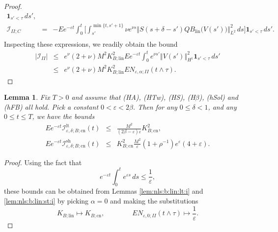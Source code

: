 \documentclass[10pt]{articleHJ}
\newcommand{\e}{\ensuremath{\varepsilon}}
\newcommand{\abs}[1]{\left\vert#1\right\vert}			%
\newcommand{\norm}[1]{\left\Vert#1\right\Vert}		%
\newtheorem{lem}[thm]{Lemma}
\numberwithin{equation}{section}
\begin{document}
\begin{proof}
\begin{equation}
\begin{array}{lcl}
         \mathbf{1}_{s' < \tau} \, ds' ,
\\[0.2cm]
\mathcal{I}_{II;C}
 & = &
   - E e^{- \e t}  \int_0^{t}
 \Big[\int_{s'}^{\min\{ t,s'+1 \} }
                      \nu e^{\nu s}
    \norm{  S(s + \delta -s') Q B_{\mathrm{lin}}\big(V(s')\big) }_{L^2}^2   \, ds
                   \Big]   \mathbf{1}_{s' < \tau}     \, ds ' .
 \\[0.2cm]
\end{array}
\end{equation}
Inspecting these expressions, we readily obtain the bound
\begin{equation}
\begin{array}{lcl}
\abs{\mathcal{I}_{II} }
& \le &
  e^{\nu} (2 + \nu)
  M^2 K_{B;\mathrm{lin}}^2
    E e^{ - \e t}
    \int_0^{t}
       e^{\nu s'}
         \norm{V(s')}_{H^1}^2 \mathbf{1}_{s' < \tau} \, ds'
\\[0.2cm]
& \le &
  e^{\nu} (2 + \nu)
  M^2 K_{B;\mathrm{lin}}^2
    E N_{\e, \alpha;II}(t \wedge \tau).
\end{array}
\end{equation}
\end{proof}



\begin{lem}
\label{lem:nls:b:cn:i}
Fix $T > 0$ and assume that (HA), (HTw), (HS),
(H$\beta$),
(hSol) and (hFB) all hold.
Pick a constant $0 < \e <  2 \beta$.
Then for
any $0 \le \delta < 1$,
and any $0 \le t \le T$,
we have the bounds
\begin{equation}
\begin{array}{lcl}
E e^{-\e t} \mathcal{I}^{\mathrm{lt}}_{\e,\delta;B;\mathrm{cn}}(t)
 & \le & \frac{M^2}{(2 \beta - \e)\e} K_{B;\mathrm{cn}}^2 ,
\\[0.2cm]
E  e^{-\e t} \mathcal{I}^{\mathrm{sh}}_{\e,\delta;B;\mathrm{cn}}(t)
 & \le &
 K_{B;\mathrm{cn}}^2 \frac{M^2}{\e} (1 + \rho^{-1}) e^{\e}
   ( 4  + \e ).
\end{array}
\end{equation}
\end{lem}
\begin{proof}
Using the fact that
\begin{equation}
e^{-\e t} \int_0^{t}
  e^{ \e s } \,ds
\le \frac{1}{\e},
\end{equation}
these bounds can be obtained
from Lemmas \ref{lem:nls:b:lin:lt:i}
and \ref{lem:nls:b:lin:st:i}
by picking $\alpha = 0$
and making the substitutions
\begin{equation}
  K_{B;\mathrm{lin}} \mapsto K_{B;\mathrm{cn}},
  \qquad
  \qquad
  E N_{\e,0;II}(t\wedge\tau) \mapsto \frac{1}{\e}.
\end{equation}
\end{proof}
\end{document}
